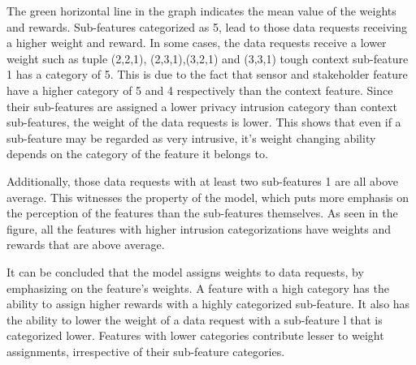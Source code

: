 %

The green horizontal line in the graph indicates the mean value of the weights and rewards. Sub-features categorized as 5, lead to those data requests receiving a higher weight and reward. In some cases, the data requests receive a lower weight such as tuple (2,2,1),
(2,3,1),(3,2,1) and (3,3,1) tough context sub-feature 1 has a category of 5. This is due to the fact that sensor and stakeholder feature have a higher category of 5 and 4 respectively than the context feature. Since their sub-features are assigned a lower privacy intrusion category than context sub-features, the weight of the data requests is lower. This shows that even if a sub-feature may be regarded as very intrusive, it's weight changing ability depends on the category of the feature it belongs to.

Additionally, those data requests with at least two sub-features 1 are all above average. This witnesses the property of the model, which puts more emphasis on the perception of the features than the sub-features themselves. As seen in the figure, all the features with higher intrusion categorizations have weights and rewards that are above average.

It can be concluded that the model assigns weights to data requests, by emphasizing on the feature's weights. A feature with a high category
has the ability to assign higher rewards with a highly categorized sub-feature. It also has the ability to lower the weight of a data request with a sub-feature l that is categorized lower. Features with lower categories contribute lesser to weight assignments, irrespective of their sub-feature categories.







